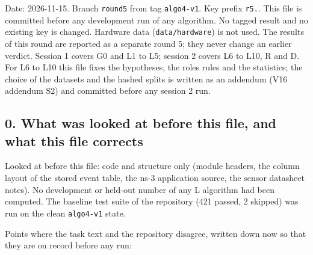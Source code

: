 


Date: 2026-11-15. Branch \texttt{round5} from tag \texttt{algo4-v1}. Key prefix \texttt{r5.}. This file is committed before any development run of any algorithm. No tagged result and no existing key is changed. Hardware data (\texttt{data/hardware}) is not used. The results of this round are reported as a separate round 5; they never change an earlier verdict. Session 1 covers G0 and L1 to L5; session 2 covers L6 to L10, R and D. For L6 to L10 this file fixes the hypotheses, the roles rules and the statistics; the choice of the datasets and the hashed splits is written as an addendum (V16 addendum S2) and committed before any session 2 run.

\subsection*{0. What was looked at before this file, and what this file corrects}

Looked at before this file: code and structure only (module headers, the column layout of the stored event table, the ns-3 application source, the sensor datasheet notes). No development or held-out number of any L algorithm had been computed. The baseline test suite of the repository (421 passed, 2 skipped) was run on the clean \texttt{algo4-v1} state.

Points where the task text and the repository disagree, written down now so that they are on record before any run:

